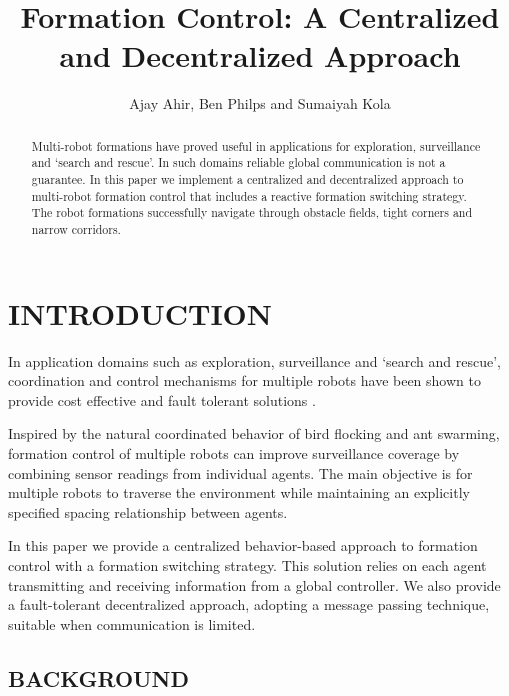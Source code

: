 \documentclass[letterpaper, 10 pt, conference]{ieeeconf}  %
\title{\LARGE \bf Formation Control: A Centralized and Decentralized Approach}
\author{Ajay Ahir, Ben Philps and Sumaiyah Kola}
\begin{document}
\maketitle
\thispagestyle{empty}
\pagestyle{empty}

\begin{abstract}
	
Multi-robot formations have proved useful in applications for exploration, surveillance and `search and rescue'. In such domains reliable global communication is not a guarantee. In this paper we implement a centralized and decentralized approach to multi-robot formation control that includes a reactive formation switching strategy. The robot formations successfully navigate through obstacle fields, tight corners and narrow corridors.

\end{abstract}
	
\section{INTRODUCTION}
	
In application domains such as exploration, surveillance and `search and rescue', coordination and control mechanisms for multiple robots have been shown to provide cost effective and fault tolerant solutions \cite{c1}.

Inspired by the natural coordinated behavior of bird flocking and ant swarming, formation control of multiple robots can improve surveillance coverage by combining sensor readings from individual agents. The main objective is for multiple robots to traverse the environment while maintaining an explicitly specified spacing relationship between agents.

In this paper we provide a centralized behavior-based approach to formation control with a formation switching strategy. This solution relies on each agent transmitting and receiving information from a global controller. We also provide a fault-tolerant decentralized approach, adopting a message passing technique, suitable when communication is limited.

\subsection{BACKGROUND}
\label{background}
\end{document}
